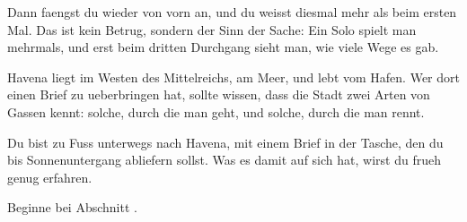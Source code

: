 \documentclass[raster]{dsa5latex}
\begin{document}

Dann faengst du wieder von vorn an, und du weisst diesmal mehr als beim
ersten Mal. Das ist kein Betrug, sondern der Sinn der Sache: Ein Solo
spielt man mehrmals, und erst beim dritten Durchgang sieht man, wie viele
Wege es gab.



Havena liegt im Westen des Mittelreichs, am Meer, und lebt vom Hafen. Wer
dort einen Brief zu ueberbringen hat, sollte wissen, dass die Stadt zwei
Arten von Gassen kennt: solche, durch die man geht, und solche, durch die
man rennt.



Du bist zu Fuss unterwegs nach Havena, mit einem Brief in der Tasche, den
du bis Sonnenuntergang abliefern sollst. Was es damit auf sich hat, wirst
du frueh genug erfahren.

Beginne bei Abschnitt .

\end{document}
